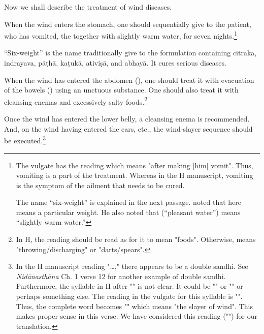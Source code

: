 \begin{translation}
    
    \item [1] 
    Now we shall describe the treatment of wind diseases.
    
    \item [2]

    \item [3] When the wind enters the stomach, one should
sequentially give to the patient, who has vomited, the
  together with
slightly warm water, for seven nights.\footnote{The vulgate has the reading
     which means "after making [him] vomit". Thus,
    vomiting is a part of the treatment. Whereas in the H manuscript,
    vomiting is the symptom of the ailment that needs to be cured.
    
    The name “six-weight” is explained in the next passage.
 noted that  here means a
particular weight. He also noted that  (“pleasant
water”) means “slightly warm water.”}

    \item [4]
    
    “Six-weight” is the name traditionally give to the formulation
containing \gls{citraka}, \gls{indrayava}, \gls{pāṭhā},
\gls{kaṭukā}, \gls{ativiṣā}, and \gls{abhayā}. It cures serious
diseases.


    \item [5]
    When the wind has entered the abdomen (), one should treat it with evacuation of the bowels () using an unctuous substance. One should also treat it with cleansing enemas and excessively salty foods.\footnote{In H, the reading  should be read as  for it to mean "foods". Otherwise,  means "throwing/discharging" or "darts/spears".} 

    \item [6]
    Once the wind has entered the lower belly, a cleansing enema is recommended. And, on the wind having entered the ears, etc., the wind-slayer sequence should be executed.\footnote{In the H manuscript reading "\ldots," there appears to be a double sandhi. %
    See \textit{Nidānasthāna} Ch. 1 verse 12 for another example of double sandhi.
    Furthermore, the syllable in H after "" is not clear. It could be "" or "" or perhaps something else. The reading in the vulgate for this syllable is "". Thus, the complete word becomes "" which means "the slayer of wind". This makes proper sense in this verse. We have considered this reading ("") for our translation.}    


\end{translation}
